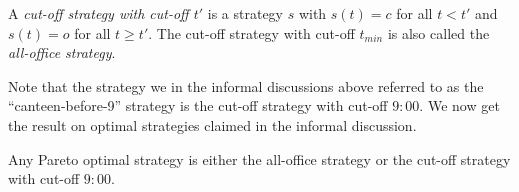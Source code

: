 \begin{definition}
A \emph{cut-off strategy with cut-off $t'$} is a strategy $s$ with $s(t) = c$ for all $t < t'$ and $s(t) = o$ for all $t \geq t'$. %
The cut-off strategy with cut-off $t_{min}$ is also called the \emph{all-office strategy}.
\end{definition}
Note that the strategy we in the informal discussions above referred to as the ``canteen-before-9'' strategy is the cut-off strategy with cut-off $9{:}00$. We now get the result on optimal strategies claimed in the informal discussion.
\begin{theorem}\label{theorem:all-office-or-cut-off}
Any Pareto optimal strategy is either the all-office strategy or the cut-off strategy with cut-off $9{:}00$.
\end{theorem}
